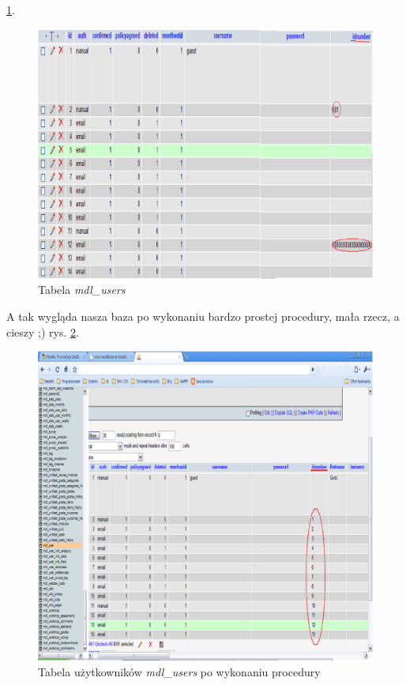 \ref{rys:tab_user}.
\begin{figure}[!h]
	\centering
		\caption{Tabela \textit{mdl\_users}} \label{rys:tab_user}
		\includegraphics[width=1\textwidth]{projekt_sys//rys//tab_user.eps}
\end{figure}
A tak wygląda nasza baza po wykonaniu bardzo prostej procedury, mała rzecz, a cieszy ;) rys. \ref{rys:baza_id_users}.
\begin{figure}[!h]
	\centering
		\caption[Tabela \textit{mdl\_users} po wykonaniu procedury]{Tabela użytkowników \textit{mdl\_users} po wykonaniu procedury} \label{rys:baza_id_users}
		\includegraphics[width=1\textwidth]{projekt_sys//rys//procedura.eps}
\end{figure}
